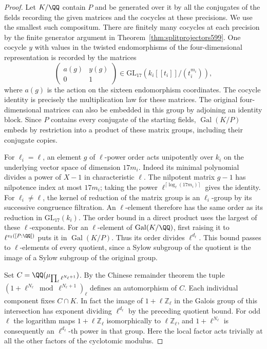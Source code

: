 \documentclass[a4paper,11pt]{article}
\theoremstyle{definition}
\theoremstyle{remark}
\newcommand{\ZZ}{\mathbb Z}\newcommand{\ord}{\operatorname{ord}}
\numberwithin{equation}{section}
\begin{document}
\begin{proof}
Let \(K/\QQ\) contain \(P\) and be generated over it by all the
conjugates of the fields recording the given matrices and the
cocycles at these precisions. We use the smallest such compositum.
There are finitely many cocycles at each precision by the finite
generator argument in Theorem~\ref{thm:splitprojectors599}.
One cocycle \(y\) with values in the twisted endomorphisms of
the four-dimensional representation is recorded by the matrices
\[
        \begin{pmatrix}a(g)&y(g)\\0&1\end{pmatrix}
        \in\mathrm{GL}_{17}(k_i[[t_i]]/(t_i^{m_i})),
\]
where \(a(g)\) is the action on the sixteen endomorphism coordinates.
The cocycle identity is precisely the multiplication law for these
matrices. The original four-dimensional matrices can also be
embedded in this group by adjoining an identity block. Since
\(P\) contains every conjugate of the starting fields,
\(\operatorname{Gal}(K/P)\) embeds by restriction into a product
of these matrix groups, including their conjugate copies.

For \(\ell_i=\ell\), an element \(g\) of \(\ell\)-power order acts
unipotently over \(k_i\) on the underlying vector space of dimension
\(17m_i\). Indeed its minimal polynomial divides a power of
\(X-1\) in characteristic \(\ell\). The nilpotent matrix \(g-1\)
has nilpotence index at most \(17m_i\); taking the power
\(\ell^{\lceil\log_\ell(17m_i)\rceil}\) gives the identity.
For \(\ell_i\ne\ell\), the kernel of reduction of the matrix
group is an \(\ell_i\)-group by its successive congruence
filtration. An \(\ell\)-element therefore has the same order
as its reduction in \(\mathrm{GL}_{17}(k_i)\). The order bound
in a direct product uses the largest of these \(\ell\)-exponents.
For an \(\ell\)-element of \(\operatorname{Gal}(K/\QQ)\),
first raising it to \(\ell^{v_\ell([P:\QQ])}\) puts it in
\(\operatorname{Gal}(K/P)\). Thus its order divides
\(\ell^{d_\ell}\). This bound passes to \(\ell\)-elements of
every quotient, since a Sylow subgroup of the quotient is the
image of a Sylow subgroup of the original group.

Set \(C=\QQ(\mu_{\prod_\ell\ell^{N_\ell+1}})\).
By the Chinese remainder theorem the tuple
\((1+\ell^{N_\ell}\bmod\ell^{N_\ell+1})_\ell\) defines an
automorphism of \(C\). Each individual component fixes \(C\cap K\).
In fact the image of \(1+\ell\ZZ_\ell\) in the Galois group
of this intersection has exponent dividing \(\ell^{d_\ell}\)
by the preceding quotient bound. For odd \(\ell\) the logarithm
maps \(1+\ell\ZZ_\ell\) isomorphically to \(\ell\ZZ_\ell\),
and \(1+\ell^{N_\ell}\) is consequently an
\(\ell^{d_\ell}\)-th power in that group. Here the local factor
acts trivially at all the other factors of the cyclotomic modulus.


\end{proof}
\end{document}
